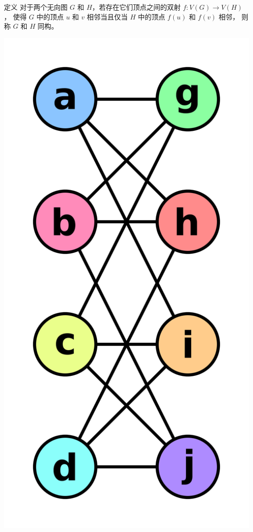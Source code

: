 \documentclass{beamer}
\begin{document}
\begin{frame}
  \begin{block}{定义}
    对于两个无向图 $G$ 和 $H$，若存在它们顶点之间的双射 $f:V(G) \rightarrow V(H)$，
    使得 $G$ 中的顶点 $u$ 和 $v$ 相邻当且仅当 $H$ 中的顶点 $f(u)$ 和 $f(v)$ 相邻，
    则称 $G$ 和 $H$ 同构。
  \end{block}
  \centering
  \includegraphics[scale=0.1]{figs/Graph_isomorphism_a.png}

\end{frame}
\end{document}
